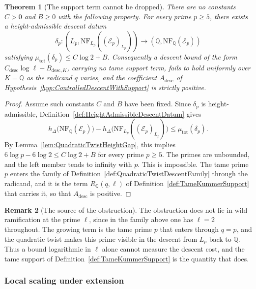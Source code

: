 \documentclass[10pt, reqno]{amsart}
\theoremstyle{plain}
\newtheorem{theorem}{Theorem}[section]
\theoremstyle{definition}
\newtheorem{remark}[theorem]{Remark}
\theoremstyle{plain}
\newcommand{\Q}{\mathbb{Q}}
\begin{document}
\begin{theorem}[The support term cannot be dropped]\label{thm:NoUniformControlledDescent}
There are no constants $C>0$ and $B\ge 0$ with the following property. For every prime $p\ge 5$, there exists a height-admissible descent datum
\[
  \delta_{p}
  \colon
  (L_{p},\mathrm{NF}_{L_{p}}((\mathcal{E}_{p})_{L_{p}}))
  \longrightarrow
  (\Q,\mathrm{NF}_{\Q}(\mathcal{E}_{p}))
\]
satisfying $\mu_{\mathrm{tot}}(\delta_{p})\le C\log 2+B$. Consequently a descent bound of the form $C_{\mathrm{desc}}\log \ell+B_{\mathrm{desc},K}$, carrying no tame support term, fails to hold uniformly over $K=\Q$ as the radicand $q$ varies, and the coefficient $A_{\mathrm{desc}}$ of Hypothesis~\ref{hyp:ControlledDescentWithSupport} is strictly positive.
\end{theorem}

\begin{proof}
Assume such constants $C$ and $B$ have been fixed. Since $\delta_{p}$ is height-admissible, Definition~\ref{def:HeightAdmissibleDescentDatum} gives
\[
  h_{\Delta}\bigl(\mathrm{NF}_{\Q}(\mathcal{E}_{p})\bigr)
  -
  h_{\Delta}\bigl(\mathrm{NF}_{L_{p}}((\mathcal{E}_{p})_{L_{p}})\bigr)
  \le
  \mu_{\mathrm{tot}}(\delta_{p}).
\]
By Lemma~\ref{lem:QuadraticTwistHeightGap}, this implies $6\log p-6\log 2\le C\log 2+B$ for every prime $p\ge 5$. The primes are unbounded, and the left member tends to infinity with $p$. This is impossible. The tame prime $p$ enters the family of Definition~\ref{def:QuadraticTwistDescentFamily} through the radicand, and it is the term $R_{\Q}(q,\ell)$ of Definition~\ref{def:TameKummerSupport} that carries it, so that $A_{\mathrm{desc}}$ is positive.
\end{proof}

\begin{remark}[The source of the obstruction]\label{rem:SourceOfUniformDescentObstruction}
The obstruction does not lie in wild ramification at the prime $\ell$, since in the family above one has $\ell=2$ throughout. The growing term is the tame prime $p$ that enters through $q=p$, and the quadratic twist makes this prime visible in the descent from $L_{p}$ back to $\Q$. Thus a bound logarithmic in $\ell$ alone cannot measure the descent cost, and the tame support of Definition~\ref{def:TameKummerSupport} is the quantity that does.
\end{remark}

\subsubsection{Local scaling under extension}\label{subsubsec:LocalScalingUnderExtension}
\end{document}
